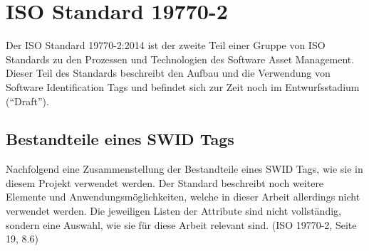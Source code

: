 \section{ISO Standard 19770-2}
\label{analyse:swidstandard} 
Der ISO Standard 19770-2:2014 ist der zweite Teil einer Gruppe von ISO Standards
zu den Prozessen und Technologien des Software Asset Management. Dieser Teil des
Standards beschreibt den Aufbau und die Verwendung von Software Identification
Tags und befindet sich zur Zeit noch im Entwurfsstadium (\enquote{Draft}).

\subsection{Bestandteile eines SWID Tags}
Nachfolgend eine Zusammenstellung der Bestandteile eines SWID Tags, wie sie in
diesem Projekt verwendet werden. Der Standard beschreibt noch weitere Elemente
und Anwendungsmöglichkeiten, welche in dieser Arbeit allerdings nicht verwendet
werden. Die jeweiligen Listen der Attribute sind nicht vollständig, sondern eine
Auswahl, wie sie für diese Arbeit relevant sind. (ISO
19770-2\cite{iso19770-2}, Seite 19, 8.6)

